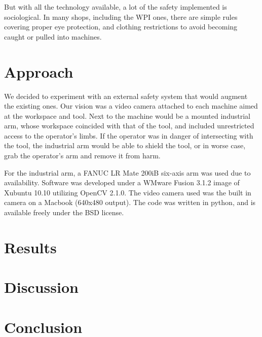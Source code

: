 \documentclass[12pt]{article}
\begin{document}
But with all the technology available, a lot of the safety implemented is sociological. In many shops, including the WPI ones, there are simple rules covering proper eye protection, and clothing restrictions to avoid becoming caught or pulled into machines\cite{WPI:safety}.

\section{Approach}
We decided to experiment with an external safety system that would augment the existing ones. Our vision was a video camera attached to each machine aimed at the workspace and tool. Next to the machine would be a mounted industrial arm, whose workspace coincided with that of the tool, and included unrestricted access to the operator's limbs. If the operator was in danger of intersecting with the tool, the industrial arm would be able to shield the tool, or in worse case, grab the operator's arm and remove it from harm.


For the industrial arm, a FANUC LR Mate 200iB six-axis arm was used due to availability\cite{fanuc}. Software was developed under a WMware Fusion 3.1.2 image of Xubuntu 10.10 utilizing OpenCV 2.1.0. The video camera used was the built in camera on a Macbook (640x480 output). The code was written in python, and is available freely under the BSD license\cite{google-code}.

\section{Results}


\section{Discussion}


\section{Conclusion}




\end{document}
